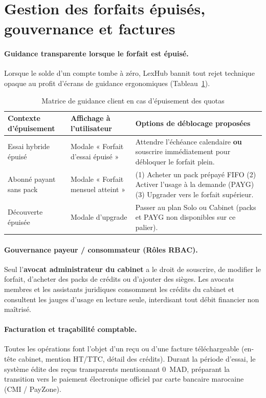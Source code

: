 \section{Gestion des forfaits épuisés, gouvernance et factures}
\label{sec:forfait-epuise}

\paragraph{Guidance transparente lorsque le forfait est épuisé.}
Lorsque le solde d'un compte tombe à zéro, LexHub bannit tout rejet technique opaque au profit d'écrans de guidance ergonomiques (Tableau~\ref{tab:quota-guidance}).

\begin{table}[H]
\centering
\caption{Matrice de guidance client en cas d'épuisement des quotas}
\label{tab:quota-guidance}
\small
\renewcommand{\arraystretch}{1.15}
\begin{tabular}{@{}p{3.4cm}p{4.2cm}p{4.8cm}@{}}
\toprule
\textbf{Contexte d'épuisement} & \textbf{Affichage à l'utilisateur} & \textbf{Options de déblocage proposées} \\
\midrule
Essai hybride épuisé &
Modale « Forfait d'essai épuisé » &
Attendre l'échéance calendaire \textbf{ou} souscrire immédiatement pour débloquer le forfait plein. \\
\addlinespace
Abonné payant sans pack &
Modale « Forfait mensuel atteint » &
(1) Acheter un pack prépayé FIFO \newline
(2) Activer l'usage à la demande (PAYG) \newline
(3) Upgrader vers le forfait supérieur. \\
\addlinespace
Découverte épuisée &
Modale d'upgrade &
Passer au plan Solo ou Cabinet (packs et PAYG non disponibles sur ce palier). \\
\bottomrule
\end{tabular}
\end{table}

\paragraph{Gouvernance payeur / consommateur (Rôles RBAC).}
Seul l'\textbf{avocat administrateur du cabinet} a le droit de souscrire, de modifier le forfait, d'acheter des packs de crédits ou d'ajouter des sièges. Les avocats membres et les assistants juridiques consomment les crédits du cabinet et consultent les jauges d'usage en lecture seule, interdisant tout débit financier non maîtrisé.

\paragraph{Facturation et traçabilité comptable.}
Toutes les opérations font l'objet d'un reçu ou d'une facture téléchargeable (en-tête cabinet, mention HT/TTC, détail des crédits). Durant la période d'essai, le système édite des reçus transparents mentionnant $0$~MAD, préparant la transition vers le paiement électronique officiel par carte bancaire marocaine (CMI / PayZone).
